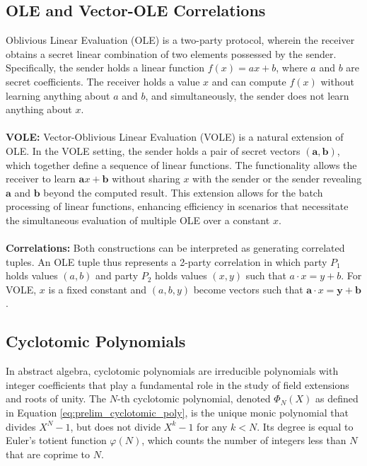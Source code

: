 \subsection{OLE and Vector-OLE Correlations}
\label{prelim:OLE_VOLE}
Oblivious Linear Evaluation (OLE) is a two-party protocol, wherein the receiver obtains a secret linear combination of two elements possessed by the sender. Specifically, the sender holds a linear function $f(x) = ax + b$, where $a$ and $b$ are secret coefficients. The receiver holds a value $x$ and can compute $f(x)$ without learning anything about $a$ and $b$, and simultaneously, the sender does not learn anything about $x$.
\\\\
\textbf{VOLE:} Vector-Oblivious Linear Evaluation (VOLE) is a natural extension of OLE. In the VOLE setting, the sender holds a pair of secret vectors \((\mathbf{a}, \mathbf{b})\), which together define a sequence of linear functions. The functionality allows the receiver to learn \(\mathbf{a}x + \mathbf{b}\) without sharing \(x\) with the sender or the sender revealing \(\mathbf{a}\) and \(\mathbf{b}\) beyond the computed result. This extension allows for the batch processing of linear functions, enhancing efficiency in scenarios that necessitate the simultaneous evaluation of multiple OLE over a constant $x$.
\\\\
\textbf{Correlations:} Both constructions can be interpreted as generating correlated tuples. An OLE tuple thus represents a 2-party correlation in which party $P_1$ holds values $(a, b)$ and party $P_2$ holds values $(x, y)$ such that $a\cdot x = y+b$. For VOLE, $x$ is a fixed constant and $(a, b, y)$ become vectors such that $\mathbf{a}\cdot x = \mathbf{y}+\mathbf{b}$.

\subsection{Cyclotomic Polynomials}
\label{prelim:cyclotomicPolys}
In abstract algebra, cyclotomic polynomials are irreducible polynomials with integer coefficients that play a fundamental role in the study of field extensions and roots of unity. The $N$-th cyclotomic polynomial, denoted $\Phi_N(X)$ as defined in Equation \ref{eq:prelim_cyclotomic_poly}, is the unique monic polynomial that divides $X^N - 1$, but does not divide $X^k - 1$ for any $k < N$. Its degree is equal to Euler's totient function $\varphi(N)$, which counts the number of integers less than $N$ that are coprime to $N$.

